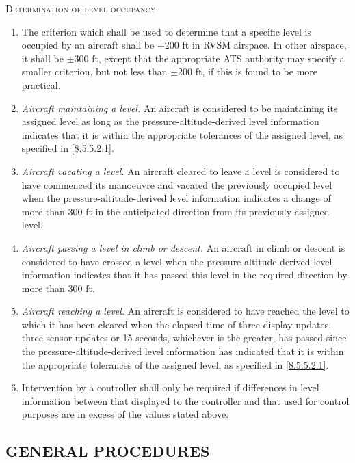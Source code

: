 \begin{enumeratesc}
    \item \textsc{Determination of level occupancy}
    \begin{enumerate}
        \item \label{8.5.5.2.1} The criterion which shall be used to determine that a specific level is occupied by an aircraft shall be $\pm$200 ft in RVSM airspace. In other airspace, it shall be $\pm$300 ft, except that the appropriate ATS authority may specify a smaller criterion, but not less than $\pm$200 ft, if this is found to be more practical.
        \item \textit{Aircraft maintaining a level.} An aircraft is considered to be maintaining its assigned level as long as the pressure-altitude-derived level information indicates that it is within the appropriate tolerances of the assigned level, as specified in \ref{8.5.5.2.1}.
        \item \textit{Aircraft vacating a level.} An aircraft cleared to leave a level is considered to have commenced its manoeuvre and vacated the previously occupied level when the pressure-altitude-derived level information indicates a change of more than 300 ft in the anticipated direction from its previously assigned level.
        \item \textit{Aircraft passing a level in climb or descent.} An aircraft in climb or descent is considered to have crossed a level when the pressure-altitude-derived level information indicates that it has passed this level in the required direction by more than 300 ft.
        \item \textit{Aircraft reaching a level.} An aircraft is considered to have reached the level to which it has been cleared when the elapsed time of three display updates, three sensor updates or 15 seconds, whichever is the greater, has passed since the pressure-altitude-derived level information has indicated that it is within the appropriate tolerances of the assigned level, as specified in \ref{8.5.5.2.1}.
        \item Intervention by a controller shall only be required if differences in level information between that displayed to the controller and that used for control purposes are in excess of the values stated above.
    \end{enumerate}
\end{enumeratesc}

\subsection[General procedures]{GENERAL PROCEDURES}

